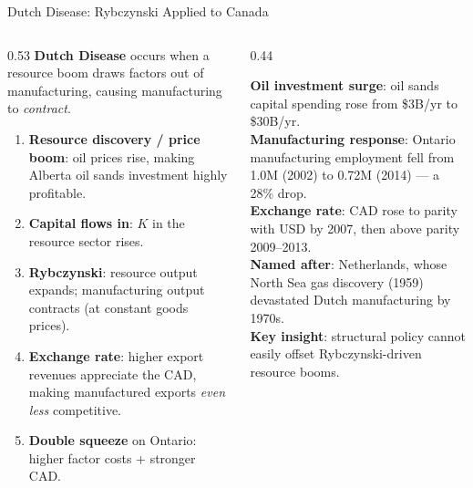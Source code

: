 \documentclass[aspectratio=169]{beamer}
\begin{document}
\begin{frame}[shrink=5]{Dutch Disease: Rybczynski Applied to Canada}
\begin{columns}[T]
\begin{column}{0.53\textwidth}
\textbf{Dutch Disease} occurs when a resource boom
draws factors out of manufacturing, causing
manufacturing to \emph{contract}.
\begin{enumerate}\small
  \item \textbf{Resource discovery / price boom}: oil
        prices rise, making Alberta oil sands
        investment highly profitable.
  \item \textbf{Capital flows in}: $K$ in the resource
        sector rises.
  \item \textbf{Rybczynski}: resource output expands;
        manufacturing output contracts (at constant
        goods prices).
  \item \textbf{Exchange rate}: higher export revenues
        appreciate the CAD, making manufactured exports
        \emph{even less} competitive.
  \item \textbf{Double squeeze} on Ontario: higher
        factor costs + stronger CAD.
\end{enumerate}
\end{column}
\begin{column}{0.44\textwidth}
\begin{canadex}
\small
\textbf{Oil investment surge}: oil sands capital
spending rose from \$3B/yr to \$30B/yr.\\[0.2em]
\textbf{Manufacturing response}: Ontario
manufacturing employment fell from 1.0M (2002)
to 0.72M (2014) --- a 28\% drop.\\[0.2em]
\textbf{Exchange rate}: CAD rose to parity with
USD by 2007, then above parity 2009--2013.\\[0.2em]
\textbf{Named after}: Netherlands, whose North Sea
gas discovery (1959) devastated Dutch manufacturing
by 1970s.\\[0.2em]
\textbf{Key insight}: structural policy cannot
easily offset Rybczynski-driven resource booms.
\end{canadex}
\end{column}
\end{columns}
\end{frame}
\end{document}
